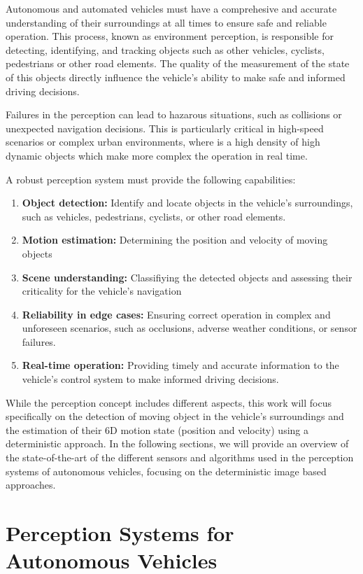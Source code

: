 Autonomous and automated vehicles must have a comprehesive and accurate understanding of their surroundings at 
all times to ensure safe and reliable operation. This process, known as environment perception, is responsible
for detecting, identifying, and tracking objects such as other vehicles, cyclists, pedestrians or other
road elements. The quality of the measurement of the state of this objects directly influence the vehicle's
ability to make safe and informed driving decisions. 

Failures in the perception can lead to hazarous situations, such as collisions or unexpected navigation decisions.
This is particularly critical in high-speed scenarios or complex urban environments, where is a high density of
high dynamic objects which make more complex the operation in real time. 

A robust perception system must provide the following capabilities:

\begin{enumerate}
  \item \textbf{Object detection:} Identify and locate objects in the vehicle's surroundings, such as vehicles, pedestrians, cyclists, or other road elements.
  \item \textbf{Motion estimation:} Determining the position and velocity of moving objects
  \item \textbf{Scene understanding:} Classifiying the detected objects and assessing their criticality for the vehicle's navigation
  \item \textbf{Reliability in edge cases:} Ensuring correct operation in complex and unforeseen scenarios, such as occlusions, adverse weather conditions, or sensor failures.
  \item \textbf{Real-time operation:} Providing timely and accurate information to the vehicle's control system to make informed driving decisions.
\end{enumerate}

While the perception concept includes different aspects, this work will focus specifically on the detection of 
moving object in the vehicle's surroundings and the estimation of their 6D motion state (position and velocity) 
using a deterministic approach. In the following sections, we will provide an overview of the state-of-the-art of
the different sensors and algorithms used in the perception systems of autonomous vehicles, focusing on the deterministic image
based approaches.

\section{Perception Systems for Autonomous Vehicles}\label{sec:PerceptionSystemsForAutonomousVehicles}


